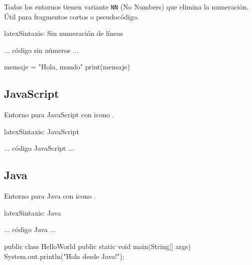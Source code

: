 Todos los entornos tienen variante \texttt{NN} (No Numbers) que elimina la numeración.
Útil para fragmentos cortos o pseudocódigo.

\begin{codigosimple}{latex}{Sintaxis: Sin numeración de líneas}
\begin{pythoncodeNN}
  ... código sin números ...
\end{pythoncodeNN}
\end{codigosimple}

\begin{pythoncodeNN}
mensaje = "Hola, mundo"
print(mensaje)
\end{pythoncodeNN}

\subsection{JavaScript}

Entorno para JavaScript con icono .

\begin{codigosimple}{latex}{Sintaxis: JavaScript}
\begin{jscode}
  ... código JavaScript ...
\end{jscode}
\end{codigosimple}


\subsection{Java}

Entorno para Java con icono .

\begin{codigosimple}{latex}{Sintaxis: Java}
\begin{javacode}
  ... código Java ...
\end{javacode}
\end{codigosimple}

\begin{javacode}
public class HelloWorld {
    public static void main(String[] args) {
        System.out.println("Hola desde Java!");
    }
}
\end{javacode}

